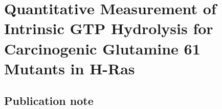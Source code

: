 \chapter{Quantitative Measurement of Intrinsic GTP Hydrolysis for
Carcinogenic Glutamine 61 Mutants in H-Ras} \label{ras}

\newcommand{\RalBSCN}{{Ral\textbeta{}I18C$_{\text{SCN}}$}}
\newcommand{\RalB}{{Ral\textbeta{}}}



\section{Publication note} \label{ras-pub-note}

